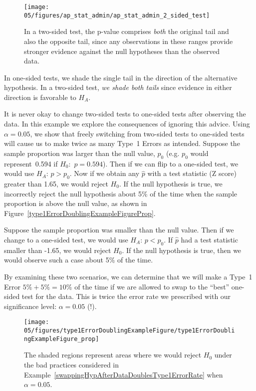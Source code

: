 \begin{figure}[ht]
\centering
\texttt{[image: 05/figures/ap\_stat\_admin/ap\_stat\_admin\_2\_sided\_test]}
\caption{In a two-sided test, the p-value comprises \emph{both} the original tail and also the opposite tail, since any observations in these ranges provide stronger evidence against the null hypotheses than the observed data.}
\label{ap_stat_admin_2_sided_test}
\end{figure}

In one-sided tests, we shade the single tail in the direction of the alternative hypothesis. In a two-sided test, \emph{we shade both tails} since evidence in either direction is favorable to $H_A$.

\begin{example}{It is never okay to change two-sided tests to one-sided tests after observing the data. In this example we explore the consequences of ignoring this advice. Using $\alpha=0.05$, we show that freely switching from two-sided tests to one-sided tests will cause us to make twice as many Type~1 Errors as intended.} \label{swappingHypAfterDataDoublesType1ErrorRate}
Suppose the sample proportion was larger than the null value, $p_0$ (e.g. $p_0$ would represent~0.594 if $H_0$:~$p = 0.594$). Then if we can flip to a one-sided test, we would use $H_A$: $p > p_0$. Now if we obtain any $\hat{p}$ with a test statistic (Z score) greater than 1.65, we would reject $H_0$. If the null hypothesis is true, we incorrectly reject the null hypothesis about 5\% of the time when the sample proportion is above the null value, as shown in Figure~\ref{type1ErrorDoublingExampleFigureProp}.

Suppose the sample proportion was smaller than the null value. Then if we change to a one-sided test, we would use $H_A$: $p < p_0$. If $\hat{p}$ had a test statistic smaller than -1.65, we would reject $H_0$. If the null hypothesis is true, then we would observe such a case about 5\% of the time.

By examining these two scenarios, we can determine that we will make a Type~1 Error $5\%+5\%=10\%$ of the time if we are allowed to swap to the ``best'' one-sided test for the data. This is twice the error rate we prescribed with our significance level: $\alpha=0.05$ (!).

\begin{figure}
   \centering
   \texttt{[image: 05/figures/type1ErrorDoublingExampleFigure/type1ErrorDoublingExampleFigure\_prop]}
   \caption{The shaded regions represent areas where we would reject $H_0$ under the bad practices considered in Example~\ref{swappingHypAfterDataDoublesType1ErrorRate} when $\alpha = 0.05$.}
   \label{type1ErrorDoublingExampleFigure}
\end{figure}

\end{example}


